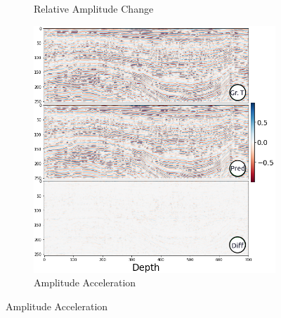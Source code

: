 \documentclass[conference]{IEEEtran}
\begin{document}
\begin{figure}[!t]
\begin{subfigure}[b]{\figattwidth\textwidth}
        \caption{Relative Amplitude Change}
        \label{fig:relative-amplitude-change}
     \end{subfigure}
     \begin{subfigure}[b]{\figattwidth\textwidth}
         \centering
        \includegraphics[width=1.0\columnwidth]{Fig/newFigs/amplitude-acceleration-half.png}
        \caption{Amplitude Acceleration}
        \label{fig:amplitude-acceleration}
     \end{subfigure}
     

\end{figure}
\end{document}
